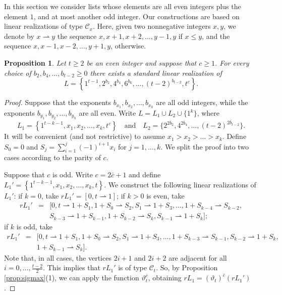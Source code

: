 \documentclass{amsart}
\newtheorem{prop}{Proposition}[section]
\theoremstyle{definition}
\numberwithin{equation}{section}
\def\C{\mathcal{C}}
\def\equad{\quad \textrm{and} \quad}
\def\su{ \rightharpoonup}
\def\giu{\rightharpoonup}
\def\th{\vartheta}
\begin{document}
In this section we consider lists whose elements are all even integers plus the element $1$, and at most another odd integer.
Our constructions are based on linear realizations of type $\C_x$.
Here, given two nonnegative integers $x,y$, we denote
by $x\su y$ the sequence $x,x+1,x+2,\ldots,y-1, y$ if $x\leq y$, and the sequence
$x,x-1,x-2,\ldots,y+1,y$, otherwise.


\begin{prop}\label{all_even}
Let $t\geq 2$ be an even integer and suppose that $c\geq 1$.
For every choice of $b_2,b_4,\ldots,b_{t-2}\geq 0$
there exists a standard linear realization of
$$L=\left\{1^{t-1}, 2^{b_2}, 4^{b_4}, 6^{b_6},\ldots, (t-2)^{b_{t-2}},  t^c \right\}.$$
\end{prop}

\begin{proof}
Suppose that the exponents $b_{x_1},b_{x_2},\ldots,b_{x_k}$ are all odd integers, while the exponents $b_{y_1},
b_{y_2},\ldots, b_{y_h}$ are all even.
Write $L= L_1 \cup L_2\cup\{1^{k}\}$, where
$$L_1 =\left\{1^{t-k-1}, x_1,x_2, \ldots, x_k,t^c\right\}\equad L_2=\{2^{2\bar b_2}, 4^{2\bar
b_4},\ldots,(t-2)^{2\bar b_{t-2}} \}.$$
It will be convenient (and not restrictive) to assume $x_1>x_2>\ldots>x_k$. Define $S_0=0$ and $S_j=\sum\limits_{i=1}^j (-1)^{i+1} x_i$
for $j=1,\ldots,k$. We split the proof into two cases according to the parity of $c$.

Suppose that $c$ is odd. Write $c=2\bar c+1$ and define $L_1'=\left\{1^{t-k-1}, x_1,x_2, \ldots, x_k,t\right\}$.
We construct the following linear realizations of $L_1'$:
if $k=0$, take $r L_1' =[0,t\giu 1]$;
if $k>0$ is even, take
$$\begin{array}{rcl}
rL_1'& =&[0, t\giu 1+S_1,  1+S_0\su S_2, S_1\giu 1+S_3,\ldots,1+S_{k-4}\su S_{k-2},\\
&&S_{k-3}\giu 1+S_{k-1},  1+S_{k-2}\su S_k, S_{k-1}\giu 1+S_k];
\end{array}$$
if $k$ is odd, take
$$\begin{array}{rcl}
rL_1'& =&[0, t\giu 1+S_1,  1+S_0\su S_2, S_1\giu 1+S_3,\ldots,1+S_{k-3}\su S_{k-1}, S_{k-2}\giu 1+S_{k}, \\
&& 1+S_{k-1}\su S_k].
\end{array}$$
Note that, in all cases, the vertices $2i+1$ and $2i+2$ are adjacent for all $i=0,\ldots,\frac{t-2}{2}$.
This implies that $rL_1'$ is of type $\C_t$. So, by Proposition \ref{prop:sigmax}(1), we can apply the function $\th_t^{\bar c}$, obtaining
$rL_1=(\th_t)^{\bar c}(rL_1')$.


\end{proof}
\end{document}
